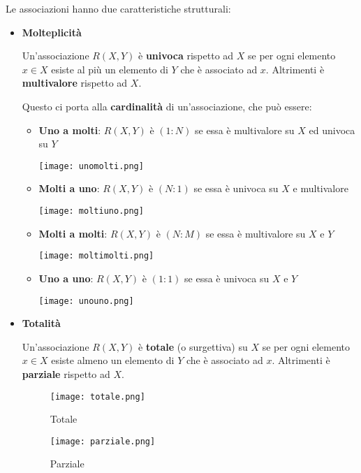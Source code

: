 \noindent Le associazioni hanno due caratteristiche strutturali:
\begin{itemize}
	\item \textbf{Molteplicità}
	\begin{definition}
		Un’associazione $R(X, Y)$ è \textbf{univoca} rispetto ad $X$ se per ogni elemento $x \in X$ esiste al più un elemento di $Y$ che è associato ad $x$. Altrimenti è \textbf{multivalore} rispetto ad $X$.
	\end{definition}
	Questo ci porta alla \textbf{cardinalità} di un'associazione, che può essere:
	\begin{itemize}
		\item \textbf{Uno a molti}: $R(X,Y)$ è $(1:N)$ se essa è multivalore su $X$ ed univoca su $Y$
		\begin{center}
			\texttt{[image: unomolti.png]}
		\end{center}
		\item \textbf{Molti a uno}: $R(X,Y)$ è $(N:1)$ se essa è univoca su $X$ e multivalore
		\begin{center}
			\texttt{[image: moltiuno.png]}
		\end{center}
		\item \textbf{Molti a molti}: $R(X,Y)$ è $(N:M)$ se essa è multivalore su $X$ e $Y$
		\begin{center}
			\texttt{[image: moltimolti.png]}
		\end{center}
		\item \textbf{Uno a uno}: $R(X,Y)$ è $(1:1)$ se essa è univoca su $X$ e $Y$
		\begin{center}
			\texttt{[image: unouno.png]}
		\end{center}
	\end{itemize}
	\item \textbf{Totalità}
	\begin{definition}
		Un’associazione $R(X, Y)$ è \textbf{totale} (o surgettiva) su $X$ se per ogni elemento $x \in X$ esiste almeno un elemento di $Y$ che è associato ad $x$. Altrimenti è \textbf{parziale} rispetto ad $X$.
	\end{definition}
	\begin{figure}[!h]
		\centering
		\begin{minipage}[b]{0.2\textwidth}
			\texttt{[image: totale.png]}
			\caption*{Totale}
		\end{minipage}
		\hspace{30pt}
		\begin{minipage}[b]{0.2\textwidth}
			\texttt{[image: parziale.png]}
			\caption*{Parziale}
		\end{minipage}
	\end{figure}
\end{itemize}


